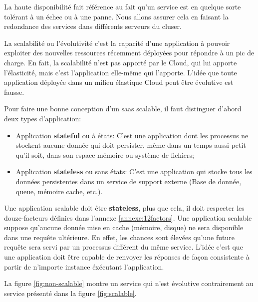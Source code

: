 \begin{onehalfspace}
La haute disponibilité fait référence au fait qu'un service est en quelque sorte tolérant à un échec ou à une panne. Nous allons assurer cela en faisant la redondance des services dans différents serveurs du cluser.

La scalabilité ou l'évolutivité c'est la capacité d'une application à pouvoir exploiter des nouvelles ressources récemment déployées pour répondre à un pic de charge. En fait, la scalabilité n'est pas apporté par le Cloud, qui lui apporte l'élasticité, mais c'est l'application elle-même qui l'apporte. L'idée que toute application déployée dans un milieu élastique Cloud peut être évolutive est fausse.


Pour faire une bonne conception d'un \acrshort{saas} scalable, il faut distinguer d'abord deux types d'application:

\begin{itemize}
	\item Application \textbf{stateful} ou à états: C'est une application dont les processus ne stockent aucune donnée qui doit persister, même dans un temps aussi petit qu'il soit, dans son espace mémoire ou système de fichiers;
	\item Application \textbf{stateless} ou sans états: C'est une application qui stocke tous les données persistentes dans un service de support externe (Base de donnée, queue, mémoire cache, etc.).
\end{itemize}

Une application scalable doit être \textbf{stateless}, plus que cela, il doit respecter les douze-facteurs définies dans l'annexe \ref{annexe:12factors}. Une application scalable suppose qu'aucune donnée mise en cache (mémoire, disque) ne sera disponible dans une requête ultérieure. En effet, les chances sont élevées qu'une future requête sera servi par un processus différent du même service. L'idée c'est que une application doit être capable de renvoyer les réponses de façon consistente à partir de n'importe instance éxécutant l'application.



La figure \ref{fig:non-scalable} montre un service qui n'est évolutive contrairement au service présenté dans la figure \ref{fig:scalable}.



\end{onehalfspace}
